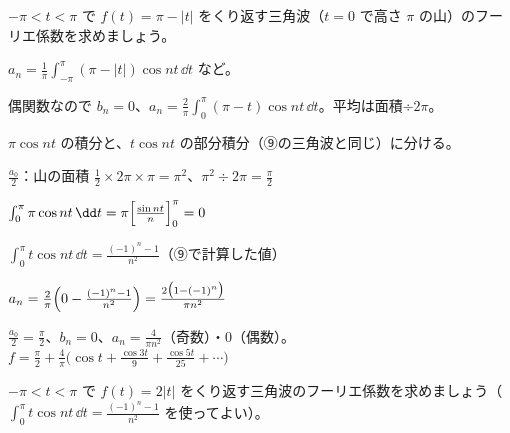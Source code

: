 \begin{reidai}[山の形の三角波]
$-\pi<t<\pi$ で $f(t)=\pi-|t|$ をくり返す三角波（$t=0$ で高さ $\pi$ の山）のフーリエ係数を求めましょう。\par
\kangaekata {}\par
{}\enspace $a_n=\frac{1}{\pi}\int_{-\pi}^{\pi}(\pi-|t|)\cos nt\,\dd t$ など。\par
{}\enspace 偶関数なので $b_n=0$、$a_n=\frac{2}{\pi}\int_0^{\pi}(\pi-t)\cos nt\,\dd t$。平均は面積÷$2\pi$。\par
{}\enspace $\pi\cos nt$ の積分と、$t\cos nt$ の部分積分（⑨の三角波と同じ）に分ける。\par
\shiki\kixcs $\frac{a_0}{2}$：山の面積 $\frac12\times2\pi\times\pi=\pi^2$、$\pi^2\div2\pi=\frac{\pi}{2}$\par
\kixca $\int_0^{\pi}\pi\cos nt\,\dd t=\pi\Bigl[\frac{\sin nt}{n}\Bigr]_0^{\pi}=0$\par
\kixca $\int_0^{\pi}t\cos nt\,\dd t=\frac{(-1)^n-1}{n^2}$\quad （⑨で計算した値）\par
\kixca $a_n=\frac{2}{\pi}\Bigl(0-\frac{(-1)^n-1}{n^2}\Bigr)=\frac{2\bigl(1-(-1)^n\bigr)}{\pi n^2}$\par
\kotae $\frac{a_0}{2}=\frac{\pi}{2}$、$b_n=0$、$a_n=\frac{4}{\pi n^2}$（奇数）・0（偶数）。\\
\hspace*{2.6\zw}$f=\frac{\pi}{2}+\frac{4}{\pi}\bigl(\cos t+\frac{\cos3t}{9}+\frac{\cos5t}{25}+\cdots\bigr)$
\end{reidai}

\begin{jibun}
$-\pi<t<\pi$ で $f(t)=2|t|$ をくり返す三角波のフーリエ係数を求めましょう（$\int_0^{\pi}t\cos nt\,\dd t=\frac{(-1)^n-1}{n^2}$ を使ってよい）。
\end{jibun}


